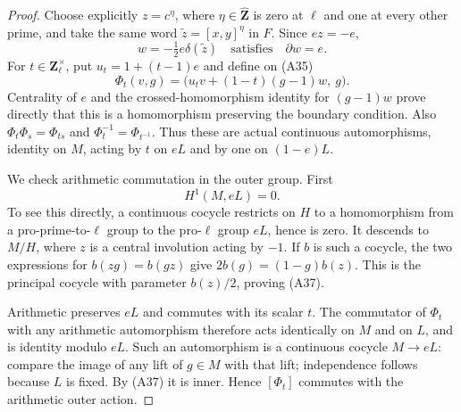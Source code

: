 \documentclass[11pt,oneside]{article}
\begin{document}
\begin{proof}
Choose explicitly $z=c^{\eta}$, where
$\eta\in\widehat{\mathbf Z}$ is zero at $\ell$
and one at every other prime, and take the same
word $\widetilde z=[x,y]^\eta$ in $F$. Since $ez=-e$,
\[
                    w=-\tfrac12e\delta(\widetilde z)
          \quad\text{satisfies}\quad \partial w=e.
\]
For $t\in\mathbf Z_\ell^\times$, put
$u_t=1+(t-1)e$ and define on (A35)
\[
 \Phi_t(v,g)=
 \bigl(u_tv+(1-t)(g-1)w,\ g\bigr).                         \tag{A36}
\]
Centrality of $e$ and the crossed-homomorphism identity
for $(g-1)w$ prove directly that this is a homomorphism
preserving the boundary condition. Also
$\Phi_t\Phi_s=\Phi_{ts}$ and
$\Phi_t^{-1}=\Phi_{t^{-1}}$. Thus these are actual
continuous automorphisms, identity on $M$, acting by
$t$ on $eL$ and by one on $(1-e)L$.

We check arithmetic commutation in the outer group.
First
\[
                         H^1(M,eL)=0.                       \tag{A37}
\]
To see this directly, a continuous cocycle restricts
on $H$ to a homomorphism from a pro-prime-to-$\ell$
group to the pro-$\ell$ group $eL$, hence is zero.
It descends to $M/H$, where $z$ is a central
involution acting by $-1$. If $b$ is such a cocycle,
the two expressions for $b(zg)=b(gz)$ give
$2b(g)=(1-g)b(z)$. This is the principal cocycle
with parameter $b(z)/2$, proving (A37).

Arithmetic preserves $eL$ and commutes with its scalar
$t$. The commutator of $\Phi_t$ with any arithmetic
automorphism therefore acts identically on $M$ and
on $L$, and is identity modulo $eL$. Such an
automorphism is a continuous cocycle $M\to eL$:
compare the image of any lift of $g\in M$ with that
lift; independence follows because $L$ is fixed.
By (A37) it is inner. Hence $[\Phi_t]$ commutes
with the arithmetic outer action.


\end{proof}
\end{document}
